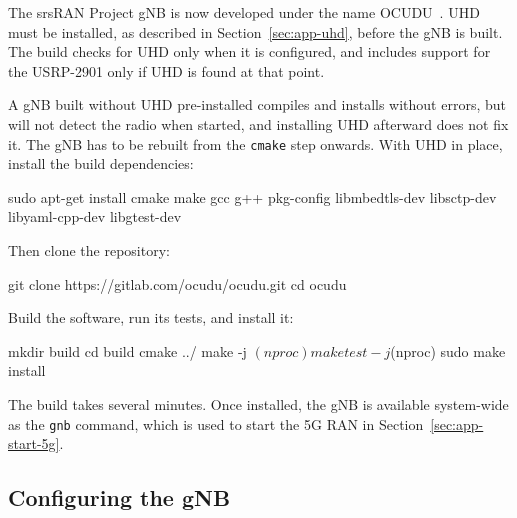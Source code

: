 The srsRAN Project \gls{gNB} is now developed under the name OCUDU~\cite{ocudu_project}.
UHD must be installed, as described in Section~\ref{sec:app-uhd}, before the \gls{gNB} is built. The build checks for UHD only when it is configured, and includes support for the USRP-2901 only if UHD is found at that point.

A \gls{gNB} built without UHD pre-installed compiles and installs without errors, but will not detect the radio when started, and installing UHD afterward does not fix it. The \gls{gNB} has to be rebuilt from the \texttt{cmake} step onwards. With UHD in place, install the build dependencies:

\begin{code}
sudo apt-get install cmake make gcc g++ pkg-config libmbedtls-dev libsctp-dev libyaml-cpp-dev libgtest-dev
\end{code}

Then clone the repository:

\begin{code}
git clone https://gitlab.com/ocudu/ocudu.git
cd ocudu
\end{code}

Build the software, run its tests, and install it:
\begin{code}
mkdir build
cd build
cmake ../
make -j $(nproc)
make test -j $(nproc)
sudo make install
\end{code}

The build takes several minutes. Once installed, the \gls{gNB} is available system-wide as the \texttt{gnb} command, which is used to start the 5G \gls{RAN} in Section~\ref{sec:app-start-5g}.

\subsection{Configuring the gNB}
\label{sec:app-gnb-config}

